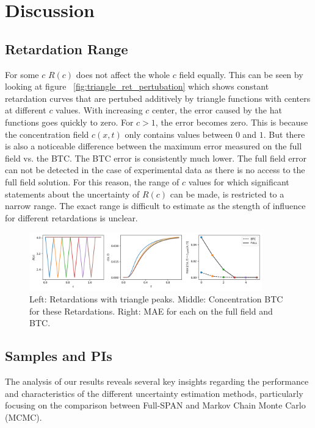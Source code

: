 \section{Discussion}
\subsection{Retardation Range} %
For some $c$ $R(c)$ does not affect the whole $c$ field equally. This can be seen by looking at figure ~\vref{fig:triangle_ret_pertubation} which shows constant retardation curves that are pertubed additively by triangle functions with centers at different $c$ values. With increasing $c$ center, the error caused by the hat functions goes quickly to zero. For $c > 1$, the error becomes zero. This is because the concentration field $c(x,t)$ only contains values between $0$ and $1$. But there is also a noticeable difference between the maximum error measured on the full field vs. the BTC. The BTC error is consistently much lower.
The full field error can not be detected in the case of experimental data as there is no access to the full field solution. For this reason, the range of $c$ values for which significant statements about the uncertainty of $R(c)$ can be made, is restricted to a narrow range. The exact range is difficult to estimate as the stength of influence for different retardations is unclear.


\begin{figure}
    \centering
    \includegraphics[width=0.9\textwidth]{figs/triangle_ret_pertubation.png}
    \caption{Left: Retardations with triangle peaks. Middle: Concentration BTC for these Retardations. Right: MAE for each on the full field and BTC.}
    \label{fig:triangle_ret_pertubation}
\end{figure}


\subsection{Samples and PIs}
The analysis of our results reveals several key insights regarding the performance and characteristics of the different uncertainty estimation methods, particularly focusing on the comparison between Full-SPAN and Markov Chain Monte Carlo (MCMC).

